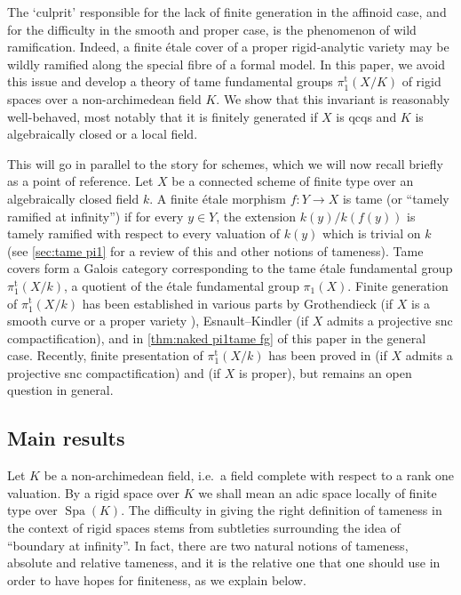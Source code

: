 \documentclass[a4paper,twoside,11pt,reqno]{amsart}
\DeclareRobustCommand{\SkipTocEntry}[5]{}
\DeclareMathOperator{\Spa}{Spa}
\newcommand{\pitame}{\pi_1^{\mathrm{t}}}
\theoremstyle{definition}
\numberwithin{equation}{subsection}
\begin{document}
The `culprit' responsible for the lack of finite generation in the affinoid case, and for the difficulty in the smooth and proper case, is the phenomenon of wild ramification. 
Indeed, a finite \'etale cover of a proper rigid-analytic variety may be wildly ramified along the special fibre of a formal model.
In this paper, we avoid this issue and develop a theory of tame fundamental groups $\pitame(X/K)$ of rigid spaces over a non-archimedean field $K$. We show that this invariant is reasonably well-behaved, most notably that it is finitely generated if $X$ is qcqs and $K$ is algebraically closed or a local field.

This will go in parallel to the story for schemes, which we will now recall briefly as a point of reference. Let $X$ be a connected scheme of finite type over an algebraically closed field $k$. A finite \'etale morphism $f\colon Y\to X$ is tame (or ``tamely ramified at infinity'') if for every $y\in Y$, the extension $k(y)/k(f(y))$ is tamely ramified with respect to every valuation of $k(y)$ which is trivial on $k$ (see \cref{sec:tame pi1} for a review of this and other notions of tameness). Tame covers form a Galois category corresponding to the tame \'etale fundamental group $\pitame(X/k)$, a quotient of the \'etale fundamental group $\pi_1(X)$. Finite generation of $\pitame(X/k)$ has been established in various parts by Grothendieck (if $X$ is a smooth curve \cite[XIII, Corollaire 2.12]{SGA1} or a proper variety \cite[X, Th\'eor\`eme 2.9]{SGA1}), Esnault--Kindler \cite{EsnaultKindler2016:LefschetzTheoremsTamely} (if $X$ admits a projective snc compactification), and in \cref{thm:naked pi1tame fg} of this paper in the general case. Recently, finite presentation of $\pitame(X/k)$ has been proved in \cite{EsnaultShustermanSrinivas2022:FinitePresentationTame} (if $X$ admits a projective snc compactification) and  \cite{LaraSrinivasStix2024:FundamentalGroupsProper} (if $X$ is proper), but remains an open question in general.

\subsection*{Main results}

Let $K$ be a non-archimedean field, i.e.\ a field complete with respect to a rank one valuation. By a rigid space over $K$ we shall mean an adic space locally of finite type over $\Spa(K)$. The difficulty in giving the right definition of tameness in the context of rigid spaces stems from subtleties surrounding the idea of ``boundary at infinity''. In fact, there are two natural notions of tameness, absolute and relative tameness, and it is the relative one that one should use in order to have hopes for finiteness, as we explain below.
\end{document}
